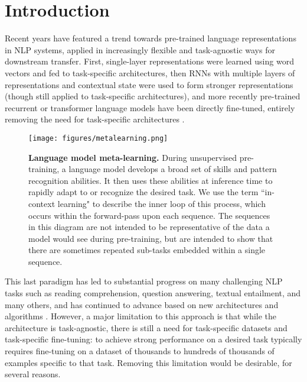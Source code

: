 \documentclass{article}
\begin{document}
\section{Introduction}
\label{section:Introduction}
Recent years have featured a trend towards pre-trained language representations in NLP systems, applied in increasingly flexible and task-agnostic ways for downstream transfer.  First, single-layer representations were learned using word vectors \cite{mikolov2013efficient, pennington2014glove} and fed to task-specific architectures, then RNNs with multiple layers of representations and contextual state were used to form stronger representations \cite{dai2015semi, mccann2017learned, peters2018dissecting} (though still applied to task-specific architectures), and more recently pre-trained recurrent or transformer language models \cite{vaswani2017attention}  have been directly fine-tuned, entirely removing the need for task-specific architectures \cite{radford2018gpt1, devlin2018bert, howard2018universal}.

\begin{figure}[b!]
\centering\texttt{[image: figures/metalearning.png]}
\caption{\textbf{Language model meta-learning.} During unsupervised pre-training, a language model develops a broad set of skills and pattern recognition abilities. It then uses these abilities at inference time to rapidly adapt to or recognize the desired task. We use the term ``in-context learning" to describe the inner loop of this process, which occurs within the forward-pass upon each sequence. The sequences in this diagram are not intended to be representative of the data a model would see during pre-training, but are intended to show that there are sometimes repeated sub-tasks embedded within a single sequence.
}
\label{figure:metalearning}
\end{figure} 
This last paradigm has led to substantial progress on many challenging NLP tasks such as reading comprehension, question answering, textual entailment, and many others, and has continued to advance based on new architectures and algorithms \cite{raffel2019t5, liu2019roberta, yang2019xlnet, lan2019albert}. However, a major limitation to this approach is that while the architecture is task-agnostic, there is still a need for task-specific datasets and task-specific fine-tuning: to achieve strong performance on a desired task typically requires fine-tuning on a dataset of thousands to hundreds of thousands of examples specific to that task.  Removing this limitation would be desirable, for several reasons.
\end{document}
